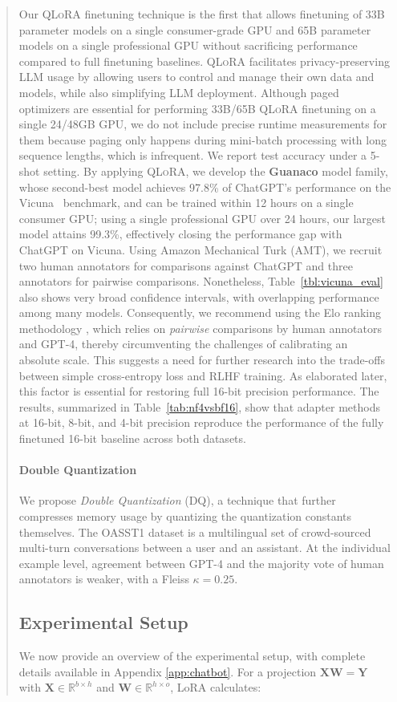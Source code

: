 {\begin{quote}
{Our \textsc{QLoRA} finetuning technique is the first that allows finetuning of 33B parameter models on a single consumer-grade GPU and 65B parameter models on a single professional GPU without sacrificing performance compared to full finetuning baselines. \textsc{QLoRA} facilitates privacy-preserving LLM usage by allowing users to control and manage their own data and models, while also simplifying LLM deployment. Although paged optimizers are essential for performing 33B/65B \textsc{QLoRA} finetuning on a single 24/48GB GPU, we do not include precise runtime measurements for them because paging only happens during mini-batch processing with long sequence lengths, which is infrequent. We report test accuracy under a 5-shot setting. By applying \textsc{QLoRA}, we develop the \textbf{Guanaco} model family, whose second-best model achieves 97.8\% of ChatGPT’s performance on the Vicuna~\citep{vicuna2023} benchmark, and can be trained within 12 hours on a single consumer GPU; using a single professional GPU over 24 hours, our largest model attains 99.3\%, effectively closing the performance gap with ChatGPT on Vicuna. Using Amazon Mechanical Turk (AMT), we recruit two human annotators for comparisons against ChatGPT and three annotators for pairwise comparisons. Nonetheless, Table~\ref{tbl:vicuna_eval} also shows very broad confidence intervals, with overlapping performance among many models. Consequently, we recommend using the Elo ranking methodology \citep{elo1967proposed}, which relies on \textit{pairwise} comparisons by human annotators and GPT-4, thereby circumventing the challenges of calibrating an absolute scale. This suggests a need for further research into the trade-offs between simple cross-entropy loss and RLHF training. As elaborated later, this factor is essential for restoring full 16-bit precision performance. The results, summarized in Table~\ref{tab:nf4vsbf16}, show that adapter methods at 16-bit, 8-bit, and 4-bit precision reproduce the performance of the fully finetuned 16-bit baseline across both datasets. \paragraph{Double Quantization{}} 
We propose \emph{Double Quantization} (DQ), a technique that further compresses memory usage by quantizing the quantization constants themselves. The OASST1 dataset is a multilingual set of crowd-sourced multi-turn conversations between a user and an assistant. At the individual example level, agreement between GPT-4 and the majority vote of human annotators is weaker, with a Fleiss $\kappa=0.25$. \subsection{Experimental Setup} We now provide an overview of the experimental setup, with complete details available in Appendix \ref{app:chatbot}. For a projection ${\mathbf{X} \mathbf{W} = \mathbf{Y}}$ with $\mathbf{X} \in \mathbb{R}^{b \times h}$ and $\mathbf{W} \in \mathbb{R}^{h \times o}$, LoRA calculates:

}
\end{quote}}
